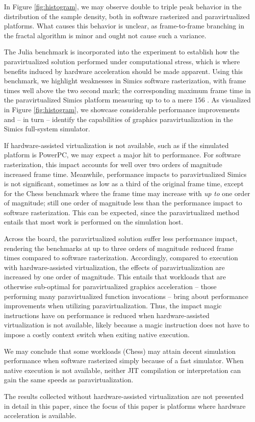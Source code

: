 In Figure \ref{fig:histogram}, we may observe double to triple peak behavior in the distribution of the sample density, both in software rasterized and paravirtualized platforms.
What causes this behavior is unclear, as frame-to-frame branching in the fractal algorithm is minor and ought not cause such a variance.

The Julia benchmark is incorporated into the experiment to establish how the paravirtualized solution performed under computational stress, which is where benefits induced by hardware acceleration should be made apparent.
Using this benchmark, we highlight weaknesses in Simics software rasterization, with frame times well above the two second mark; the corresponding maximum frame time in the paravirtualized Simics platform measuring up to to a mere $156$ \milli\second .
As visualized in Figure \ref{fig:histogram}, we showcase considerable performance improvements and -- in turn -- identify the capabilities of graphics paravirtualization in the Simics full-system simulator.

If hardware-assisted virtualization is not available, such as if the simulated platform is PowerPC, we may expect a major hit to performance.
For software rasterization, this impact accounts for well over two orders of magnitude increased frame time.
Meanwhile, performance impacts to paravirtualized Simics is not significant, sometimes as low as a third of the original frame time, except for the Chess benchmark where the frame time may increase with \textit{up to} one order of magnitude; still one order of magnitude less than the performance impact to software rasterization.
This can be expected, since the paravirtualized method entails that most work is performed on the simulation host.

Across the board, the paravirtualized solution suffer less performance impact, rendering the benchmarks at up to three orders of magnitude reduced frame times compared to software rasterization.
Accordingly, compared to execution with hardware-assisted virtualization, the effects of paravirtualization are increased by one order of magnitude.
This entails that workloads that are otherwise sub-optimal for paravirtualized graphics acceleration -- those performing many paravirtualized function invocations -- bring about performance improvements when utilizing paravirtualization.
Thus, the impact magic instructions have on performance is reduced when hardware-assisted virtualization is not available, likely because a magic instruction does not have to impose a costly context switch when exiting native execution.

We may conclude that some workloads (Chess) may attain decent simulation performance when software rasterized simply because of a fast simulator.
When native execution is not available, neither JIT compilation or interpretation can gain the same speeds as paravirtualization.

The results collected without hardware-assisted virtualization are not presented in detail in this paper, since the focus of this paper is platforms where hardware acceleration is available.
